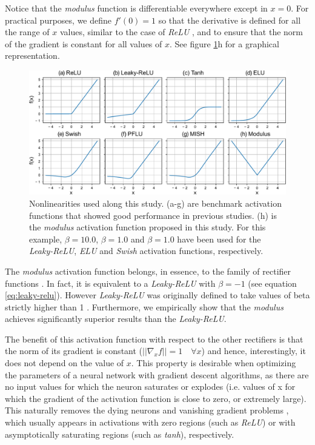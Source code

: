 \documentclass[authoryear]{elsarticle}
\begin{document}
Notice that the \textit{modulus} function is differentiable everywhere except in $x = 0$. For practical purposes, we define $f'(0) = 1$ so that the derivative is defined for all the range of $x$ values, similar to the case of \textit{ReLU} \citep{goodfellow2016}, and to ensure that the norm of the gradient is constant for all values of $x$. See figure \ref{fig:activations}h for a graphical representation.


\begin{figure}
	\centering
	\includegraphics[width=1.0\linewidth]{figs/activations}
	\caption{Nonlinearities used along this study. (a-g) are benchmark activation functions that showed good performance in previous studies. (h) is the \textit{modulus} activation function proposed in this study. For this example, $\beta=10.0$, $\beta=1.0$ and $\beta=1.0$ have been used for the \textit{Leaky-ReLU}, \textit{ELU} and \textit{Swish} activation functions, respectively.}
	\label{fig:activations}
\end{figure}

The \textit{modulus} activation function belongs, in essence, to the family of rectifier functions \citep{glorot2015} . In fact, it is equivalent to a \textit{Leaky-ReLU} with $\beta=-1$ (see equation \ref{eq:leaky-relu}). However \textit{Leaky-ReLU} was originally defined to take values of beta strictly higher than 1 \citep{xu2015}. Furthermore, we empirically show that the \textit{modulus} achieves significantly superior results than the \textit{Leaky-ReLU}.

The benefit of this activation function with respect to the other rectifiers is that the norm of its gradient is constant ($||\nabla_x f|| = 1 \quad \forall x$) and hence, interestingly, it does not depend on the value of $x$. This property is desirable when optimizing the parameters of a neural network with gradient descent algorithms, as there are no input values for which the neuron saturates or explodes \citep{glorot2010} (i.e. values of x for which the gradient of the activation function is close to zero, or extremely large). This naturally removes the dying neurons \citep{lu2020} and vanishing gradient problems \citep{pascanu13, hochreiter1998, Hochreiter2001}, which usually appears in activations with zero regions (such as \textit{ReLU}) or with asymptotically saturating regions (such as \textit{tanh}), respectively.
\end{document}
